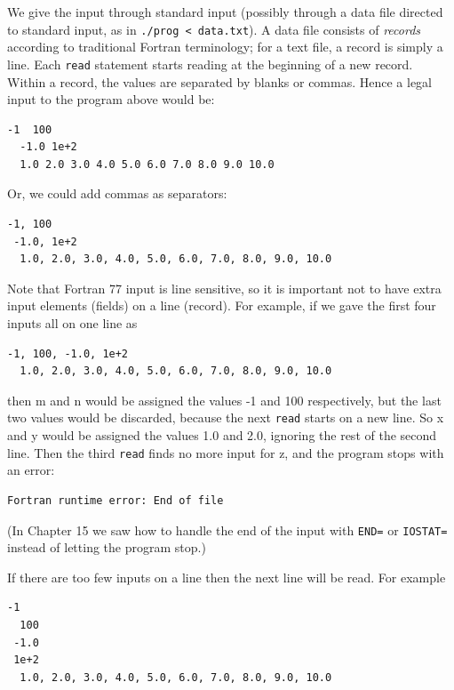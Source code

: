 We give the input through standard input (possibly through a data file directed to standard input, as in \texttt{./prog < data.txt}). A data file consists of \emph{records} according to traditional Fortran terminology; for a text file, a record is simply a line. Each \texttt{read} statement starts reading at the beginning of a new record. Within a record, the values are separated by blanks or commas. Hence a legal input to the program above would be:

\begin{lstlisting}[style=fortran77]
   -1  100
  -1.0 1e+2
  1.0 2.0 3.0 4.0 5.0 6.0 7.0 8.0 9.0 10.0
\end{lstlisting}

Or, we could add commas as separators:

\begin{lstlisting}[style=fortran77]
   -1, 100
 -1.0, 1e+2
  1.0, 2.0, 3.0, 4.0, 5.0, 6.0, 7.0, 8.0, 9.0, 10.0
\end{lstlisting}

Note that Fortran 77 input is line sensitive, so it is important not to have extra input elements (fields) on a line (record). For example, if we gave the first four inputs all on one line as

\begin{lstlisting}[style=fortran77]
   -1, 100, -1.0, 1e+2
  1.0, 2.0, 3.0, 4.0, 5.0, 6.0, 7.0, 8.0, 9.0, 10.0
\end{lstlisting}

then m and n would be assigned the values -1 and 100 respectively, but the last two values would be discarded, because the next \texttt{read} starts on a new line. So x and y would be assigned the values 1.0 and 2.0, ignoring the rest of the second line. Then the third \texttt{read} finds no more input for z, and the program stops with an error:

\begin{lstlisting}[style=output]
Fortran runtime error: End of file
\end{lstlisting}

(In Chapter 15 we saw how to handle the end of the input with \texttt{END=} or \texttt{IOSTAT=} instead of letting the program stop.)

If there are too few inputs on a line then the next line will be read. For example

\begin{lstlisting}[style=fortran77]
   -1
  100
 -1.0
 1e+2
  1.0, 2.0, 3.0, 4.0, 5.0, 6.0, 7.0, 8.0, 9.0, 10.0
\end{lstlisting}

